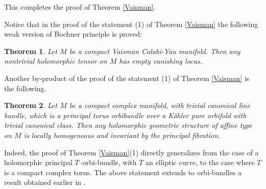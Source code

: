 \documentclass[12pt,reqno]{amsart}
\newtheorem{theorem}{Theorem}[section]
\theoremstyle{definition}
\numberwithin{equation}{section}
\begin{document}
This completes the proof of Theorem \ref{Vaisman}.

Notice that in the proof of the statement (1) of Theorem \ref{Vaisman} the following weak 
version of Bochner principle is proved:

\begin{theorem}\label{Bochner}
Let $M$ be a compact Vaisman Calabi-Yau manifold. Then any nontrivial holomorphic tensor on $M$ has empty 
vanishing locus.
\end{theorem}

Another by-product of the proof of the statement (1) of Theorem \ref{Vaisman} is the following.

\begin{theorem}\label{orbibundle}
Let $M$ be a compact complex manifold, with trivial canonical line bundle, which is a principal torus
orbibundle over a K\"ahler pure orbifold with trivial canonical class. Then any holomorphic geometric structure 
of affine type on $M$ is locally homogeneous and invariant by the principal fibration.
\end{theorem}

Indeed, the proof of Theorem \ref{Vaisman}(1) directly generalizes from the case of a holomorphic principal 
$T$--orbi-bundle, with $T$ an elliptic curve, to the case where $T$ is a compact complex torus. The above 
statement extends to orbi-bundles a result obtained earlier in \cite[Theorem 1.2]{BD2}.
\end{document}
